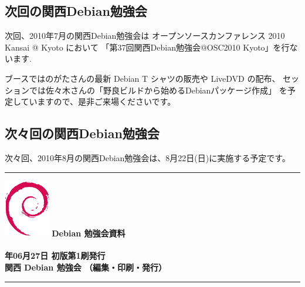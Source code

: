 \documentclass[mingoth,a4paper]{jsarticle}
\newcommand{\debmtgyear}{2010}
\newcommand{\debmtgdate}{27}
\newcommand{\debmtgmonth}{06}
\begin{document}

\subsection{次回の関西Debian勉強会}
次回、2010年7月の関西Debian勉強会は
オープンソースカンファレンス 2010 Kansai @ Kyoto において
「第37回関西Debian勉強会@OSC2010 Kyoto」を行ないます.

ブースではのがたさんの最新 Debian T シャツの販売や LiveDVD の配布、
セッションでは佐々木さんの「野良ビルドから始めるDebianパッケージ作成」
を予定していますので、是非ご来場くださいです。

\subsection{次々回の関西Debian勉強会}
次々回、2010年8月の関西Debian勉強会は、8月22日(日)に実施する予定です。


\printindex
 \cleartooddpage

 \begin{minipage}[b]{0.2\hsize}
 \end{minipage}
 \begin{minipage}[b]{0.8\hsize}

 \vspace*{15cm}
 \rule{\hsize}{1mm}
 \vspace{2mm}
 \includegraphics[width=2cm]{image200502/openlogo-nd.eps}
 \noindent \Large \bf Debian 勉強会資料\\ \\
 \noindent \normalfont \debmtgyear{}年\debmtgmonth{}月\debmtgdate{}日 \hspace{5mm}  初版第1刷発行\\
 \noindent \normalfont 関西 Debian 勉強会 （編集・印刷・発行）\\
 \rule{\hsize}{1mm}
 \end{minipage}
\end{document}
